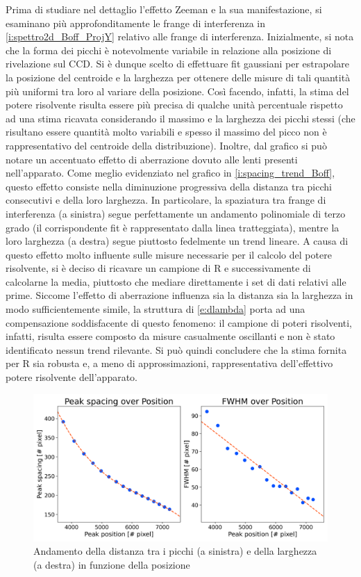 \documentclass[twocolumn,10pt]{asme2ej}
\begin{document}
Prima di studiare nel dettaglio l'effetto Zeeman e la sua manifestazione, si esaminano più approfonditamente le frange
di interferenza in \autoref{i:spettro2d_Boff_ProjY} relativo alle frange di interferenza. Inizialmente, si nota che la
forma dei picchi è notevolmente variabile in relazione alla posizione di rivelazione sul CCD. Si è dunque scelto di
effettuare fit gaussiani per estrapolare la posizione del centroide e la larghezza per ottenere delle misure di tali
quantità più uniformi tra loro al variare della posizione. Così facendo, infatti, la stima del potere risolvente risulta
essere più precisa di qualche unità percentuale rispetto ad una stima ricavata considerando il massimo e la larghezza
dei picchi stessi (che risultano essere quantità molto variabili e spesso il massimo del picco non è rappresentativo del
centroide della distribuzione). Inoltre, dal grafico si può notare un accentuato effetto di aberrazione dovuto alle
lenti presenti nell'apparato. Come meglio evidenziato nel grafico in \autoref{i:spacing_trend_Boff}, questo effetto
consiste nella diminuzione progressiva della distanza tra picchi consecutivi e della loro larghezza. In particolare, la
spaziatura tra frange di interferenza (a sinistra) segue perfettamente un andamento polinomiale di terzo grado (il
corrispondente fit è rappresentato dalla linea tratteggiata), mentre la loro larghezza (a destra) segue piuttosto
fedelmente un trend lineare. A causa di questo effetto molto influente sulle misure necessarie per il calcolo del potere
risolvente, si è deciso di ricavare un campione di R e successivamente di calcolarne la media, piuttosto che mediare
direttamente i set di dati relativi alle prime. Siccome l'effetto di aberrazione influenza sia la distanza sia la
larghezza in modo sufficientemente simile, la struttura di \autoref{e:dlambda} porta ad una compensazione soddisfacente
di questo fenomeno: il campione di poteri risolventi, infatti, risulta essere composto da misure casualmente oscillanti
e non è stato identificato nessun trend rilevante. Si può quindi concludere che la stima fornita per R sia robusta e, a
meno di approssimazioni, rappresentativa dell'effettivo potere risolvente dell'apparato.

\begin{figure}
    \centering
    \includegraphics[width=\linewidth]{../Plots/Boff_spacing_trend.png}
    \caption{Andamento della distanza tra i picchi (a sinistra) e della larghezza (a destra) in funzione della posizione}
    \label{i:spacing_trend_Boff}
    \vspace{-10pt}
\end{figure}
\end{document}
